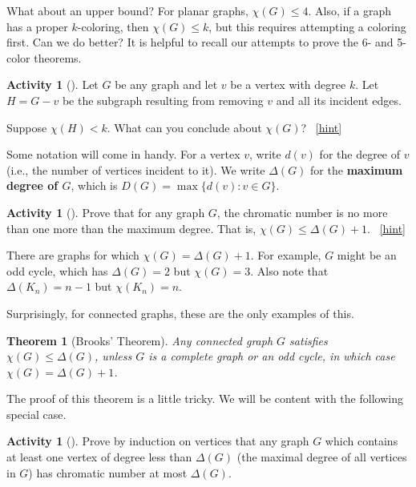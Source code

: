\documentclass[10pt,]{book}
\newcommand{\terminology}[1]{\textbf{#1}}
\theoremstyle{plain}
\newtheorem{theorem}{Theorem}[section]
\theoremstyle{definition}
\theoremstyle{definition}
\theoremstyle{definition}
\newtheorem{activity}[project]{Activity}
\numberwithin{equation}{chapter}
\def\st{:}
\newcommand{\lt}{<}
\begin{document}
\hypertarget{p-387}{}%
What about an upper bound?  For planar graphs, \(\chi(G) \le 4\).  Also, if a graph has a proper \(k\)-coloring, then \(\chi(G) \le k\), but this requires attempting a coloring first.  Can we do better? It is helpful to recall our attempts to prove the 6- and 5-color theorems.%
\begin{activity}[]\label{activity-37}
\hypertarget{p-388}{}%
Let \(G\) be any graph and let \(v\) be a vertex with degree \(k\).  Let \(H = G - v\) be the subgraph resulting from removing \(v\) and all its incident edges.%
\par
\hypertarget{p-389}{}%
Suppose \(\chi(H) \lt k\).  What can you conclude about \(\chi(G)\)?%
~\hfill{\tiny\hyperlink{a-44}{[hint]}\hypertarget{q-44}{}}\end{activity}
\hypertarget{p-391}{}%
Some notation will come in handy.  For a vertex \(v\), write \(d(v)\) for the degree of \(v\) (i.e., the number of vertices incident to it).  We write \(\Delta(G)\) for the \terminology{maximum degree of \(G\)}, which is \(D(G) = \max\{d(v) \st v \in G\}\).%
\begin{activity}[]\label{activity-38}
\hypertarget{p-392}{}%
Prove that for any graph \(G\), the chromatic number is no more than one more than the maximum degree.  That is, \(\chi(G) \le \Delta(G) + 1\).%
~\hfill{\tiny\hyperlink{a-45}{[hint]}\hypertarget{q-45}{}}\end{activity}
\hypertarget{p-394}{}%
There are graphs for which \(\chi(G) = \Delta(G) + 1\).  For example, \(G\) might be an odd cycle, which has \(\Delta(G) = 2\) but \(\chi(G) = 3\).  Also note that \(\Delta(K_n) = n-1\) but \(\chi(K_n) = n\).%
\par
\hypertarget{p-395}{}%
Surprisingly, for connected graphs, these are the only examples of this.%
\begin{theorem}[{Brooks' Theorem}]\label{theorem-6}
\hypertarget{p-396}{}%
 Any connected graph \(G\) satisfies \(\chi(G) \le \Delta(G)\), unless \(G\) is a complete graph or an odd cycle, in which case \(\chi(G) = \Delta(G) + 1\).%
\end{theorem}
\hypertarget{p-397}{}%
The proof of this theorem is a little tricky.  We will be content with the following special case.%
\begin{activity}[]\label{activity-39}
\hypertarget{p-398}{}%
Prove by induction on vertices that any graph \(G\) which contains at least one vertex of degree less than \(\Delta(G)\) (the maximal degree of all vertices in \(G\)) has chromatic number at most \(\Delta(G)\).%
\end{activity}
\typeout{************************************************}
\typeout{************************************************}
\end{document}
